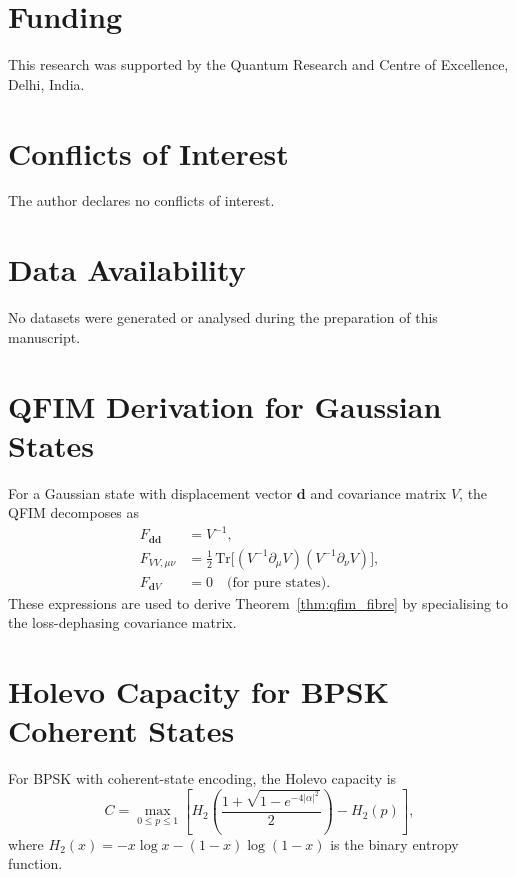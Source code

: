 \documentclass[journal,twocolumn]{IEEEtran}
\theoremstyle{definition}
\theoremstyle{plain}
\newcommand{\Tr}{\mathrm{Tr}}
\begin{document}
\section*{Funding}

This research was supported by the Quantum Research and Centre of
Excellence, Delhi, India.

\section*{Conflicts of Interest}

The author declares no conflicts of interest.

\section*{Data Availability}

No datasets were generated or analysed during the preparation of
this manuscript.

\appendices

\section{QFIM Derivation for Gaussian States}
\label{app:qfim}

For a Gaussian state with displacement vector $\mathbf{d}$ and
covariance matrix $V$, the QFIM decomposes as
\begin{align}
  F_{\mathbf{d}\mathbf{d}} &= V^{-1}, \label{eq:Fdd}\\
  F_{VV,\mu\nu} &= \tfrac{1}{2}\,\Tr\!\bigl[(V^{-1}\partial_\mu V)
    (V^{-1}\partial_\nu V)\bigr], \label{eq:FVV}\\
  F_{\mathbf{d}V} &= 0 \quad \text{(for pure states)}. \label{eq:FdV}
\end{align}
These expressions are used to derive Theorem~\ref{thm:qfim_fibre} by
specialising to the loss-dephasing covariance matrix.

\section{Holevo Capacity for BPSK Coherent States}
\label{app:holevo_bpsk}

For BPSK with coherent-state encoding, the Holevo capacity is
\begin{equation}
  C = \max_{0 \le p \le 1}\!\left[
    H_2\!\left(\frac{1+\sqrt{1-e^{-4|\alpha|^2}}}{2}\right)
    - H_2(p)\right],
\end{equation}
where $H_2(x) = -x\log x - (1-x)\log(1-x)$ is the binary entropy
function.
\end{document}
